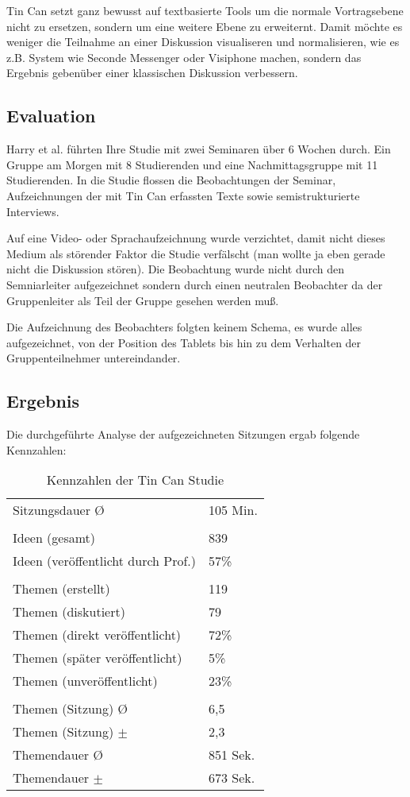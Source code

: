Tin Can setzt ganz bewusst auf textbasierte Tools um die normale Vortragsebene
nicht zu ersetzen, sondern um eine weitere Ebene zu erweiternt. Damit möchte es
weniger die Teilnahme an einer Diskussion visualiseren und normalisieren, wie es
z.B. System wie Seconde Messenger oder Visiphone machen, sondern das Ergebnis
gebenüber einer klassischen Diskussion verbessern.

\subsection{Evaluation}
Harry et al. führten Ihre Studie mit zwei Seminaren über 6 Wochen durch. Ein
Gruppe am Morgen mit 8 Studierenden und eine Nachmittagsgruppe mit 11
Studierenden. In die Studie flossen die Beobachtungen der Seminar,
Aufzeichnungen der mit Tin Can erfassten Texte sowie semistrukturierte
Interviews.

Auf eine Video- oder Sprachaufzeichnung wurde verzichtet, damit nicht dieses
Medium als störender Faktor die Studie verfälscht (man wollte ja eben gerade
nicht die Diskussion stören). Die Beobachtung wurde nicht durch den
Semniarleiter aufgezeichnet sondern durch einen neutralen Beobachter da der
Gruppenleiter als Teil der Gruppe gesehen werden muß.

Die Aufzeichnung des Beobachters folgten keinem Schema, es wurde alles
aufgezeichnet, von der Position des Tablets bis hin zu dem Verhalten der
Gruppenteilnehmer untereindander.


\subsection{Ergebnis}
Die durchgeführte Analyse der aufgezeichneten Sitzungen ergab folgende Kennzahlen:

\begin{table}[htp]
  \begin{tabular}{ l  l }
    Sitzungsdauer \O & 105 Min.\\
    \\
    Ideen  (gesamt) &  839 \\
    Ideen  (veröffentlicht durch Prof.) & 57\% \\
    \\
    Themen (erstellt) & 119 \\
    Themen (diskutiert) & 79 \\
    Themen (direkt veröffentlicht) & 72\% \\
    Themen (später veröffentlicht) & 5\% \\ 
    Themen (unveröffentlicht) & 23\% \\
    \\
    Themen (Sitzung) \O & 6,5 \\
    Themen (Sitzung) $\pm$ & 2,3 \\
    Themendauer \O & 851 Sek. \\
    Themendauer $\pm$ & 673 Sek. \\
  \end{tabular}
  \caption{Kennzahlen der Tin Can Studie}
\end{table}

